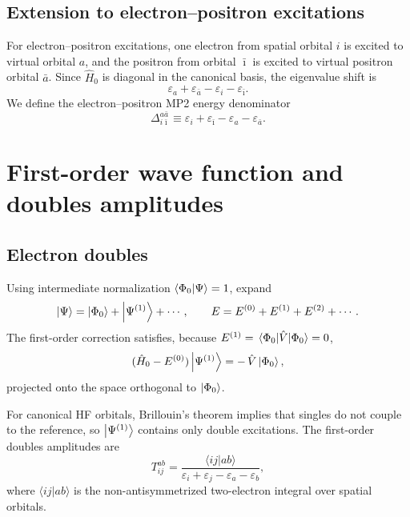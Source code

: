 \documentclass[11pt]{article}
\begin{document}
\subsection*{Extension to electron--positron excitations}

For electron--positron excitations, one electron from spatial orbital $i$
is excited to virtual orbital $a$, and the positron from orbital $\bar\imath$
is excited to virtual positron orbital $\bar a$.
Since $\hat H_0$ is diagonal in the canonical basis, the eigenvalue shift is
\begin{equation}
\varepsilon_a + \varepsilon_{\bar a} - \varepsilon_i - \varepsilon_{\bar\imath}.
\end{equation}
We define the electron--positron MP2 energy denominator
\begin{equation}
\Delta_{i\bar\imath}^{a\bar a} \equiv \varepsilon_i + \varepsilon_{\bar\imath} - \varepsilon_a - \varepsilon_{\bar a}.
\end{equation}

\section*{First-order wave function and doubles amplitudes}

\subsection*{Electron doubles}

Using intermediate normalization $\braket{\Phi_0}{\Psi}=1$, expand
\begin{equation}
\ket{\Psi} = \ket{\Phi_0} + \ket{\Psi^{(1)}} + \cdots,
\qquad
E = E^{(0)} + E^{(1)} + E^{(2)} + \cdots .
\end{equation}
The first-order correction satisfies, because $E^{(1)} = \mel{\Phi_0}{\hat V}{\Phi_0} = 0$,
\begin{equation}
(\hat H_0 - E^{(0)})\ket{\Psi^{(1)}} = -\,\hat V\ket{\Phi_0},
\end{equation}
projected onto the space orthogonal to $\ket{\Phi_0}$.

For canonical HF orbitals, Brillouin's theorem implies that singles do not
couple to the reference, so $\ket{\Psi^{(1)}}$ contains only double excitations.
The first-order doubles amplitudes are
\begin{equation}
T_{ij}^{ab}
=
\frac{\langle ij | ab\rangle}{\varepsilon_i + \varepsilon_j - \varepsilon_a - \varepsilon_b},
\end{equation}
where $\langle ij | ab\rangle$ is the non-antisymmetrized two-electron integral
over spatial orbitals.
\end{document}
